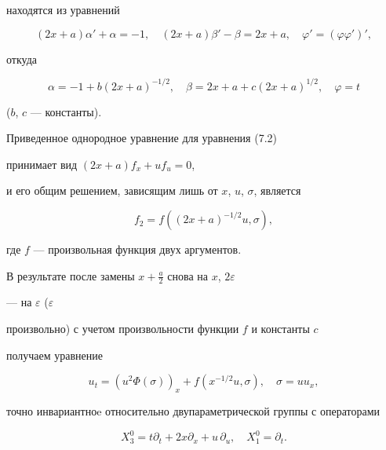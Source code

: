 находятся из уравнений 


$$ 


(2x+a)\alpha'+\alpha=-1,\quad 


(2x+a)\beta'-\beta=2x+a,\quad 


\varphi'=(\varphi\varphi')', 


$$ 


откуда 


$$ 


\alpha=-1+b(2x+a)^{-1/2},\quad 


\beta=2x+a+c(2x+a)^{1/2},\quad \varphi=t 


$$ 


($b$, $c$ --- константы). 


 


Приведенное однородное уравнение для уравнения (7.2) 


принимает вид $(2x+a)f_x+u{}f_u=0$, 


и его общим решением, зависящим лишь от $x$, $u$, $\sigma$, является 


\begin{equation} 


f_2=f((2x+a)^{-1/2}u,\sigma),\tag{7.4} 


\end{equation} 


где $f$ --- произвольная функция двух аргументов. 


 


В результате после замены $x+\frac{a}{2}$ снова на $x$, $2\varepsilon$ 


--- на $\varepsilon$ ($\varepsilon$ 


произвольно) с учетом произвольности функции $f$ и константы $c$ 


получаем уравнение 


\begin{equation} 


u_t=(u^2\Phi(\sigma))_x+f(x^{-1/2}u,\sigma),\quad 


\sigma=u u_x, \tag{7.5} 


\end{equation} 


точно инвариантноe относительно двупараметрической группы с операторами 


\begin{equation} 


X^0_3=t\partial _t+2x\partial _x+u\,\partial _u,\quad 


X^0_1=\partial _t. \tag{7.6} 


\end{equation} 


